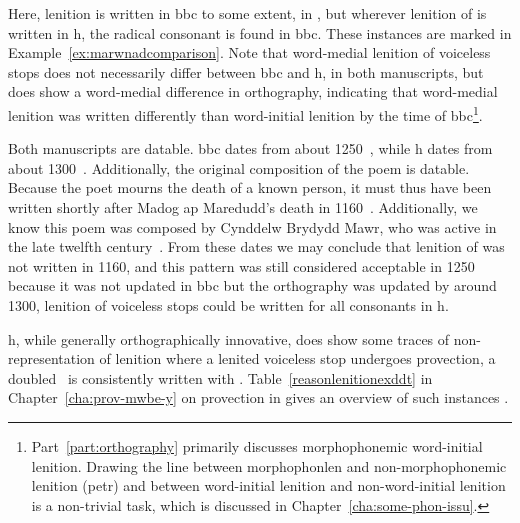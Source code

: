 Here,  lenition is written in \gls{bbc} to some extent, \eg in , but wherever lenition  of  is written in \gls{h}, the radical consonant is found in \gls{bbc}. These instances are marked in Example~\ref{ex:marwnadcomparison}. Note that word-medial lenition of voiceless stops does not necessarily differ between \gls{bbc} and \gls{h}, \cf {} in both manuscripts, but  does show a word-medial difference in orthography, indicating that word-medial lenition was written differently than word-initial lenition by the time of \gls{bbc}\footnote{Part~\ref{part:orthography} primarily discusses morphophonemic word-initial lenition. Drawing the line between \gls{morphophonlen} and non-morphophonemic lenition (\gls{petr}) and between  word-initial lenition and non-word-initial lenition is a non-trivial task, which is discussed in Chapter~\ref{cha:some-phon-issu}.}.

Both manuscripts are datable. \Gls{bbc} dates from about 1250~\autocite[xxiv]{jones_rhagymadrodd_1982}, while \gls{h} dates from about 1300~\autocite{huws_llawysgrif_1981}. Additionally, the original composition of the poem is datable. Because the poet mourns the death of a known person, it must thus have been written shortly after Madog ap Maredudd's death in 1160~\autocite[82]{jones_gwaith_1991}. Additionally, we know this poem was composed by Cynddelw Brydydd Mawr, who was active in the late twelfth century~\autocite[xxx]{jones_gwaith_1991}. From these dates we may conclude that lenition of  was  not written in 1160, and this pattern was still considered acceptable in 1250 because it was not updated in \gls{bbc} but the orthography was updated by around 1300, lenition of voiceless stops could be written for all consonants in  \gls{h}.

\Gls{h}, while generally orthographically innovative, does show some traces of non-representation of lenition where a lenited voiceless stop undergoes provection, \ie a doubled \lT\ is consistently written with . Table~\ref{reasonlenitionexddt}   in Chapter~\ref{cha:prov-mwbe-y} on provection in  gives an overview of such instances .

